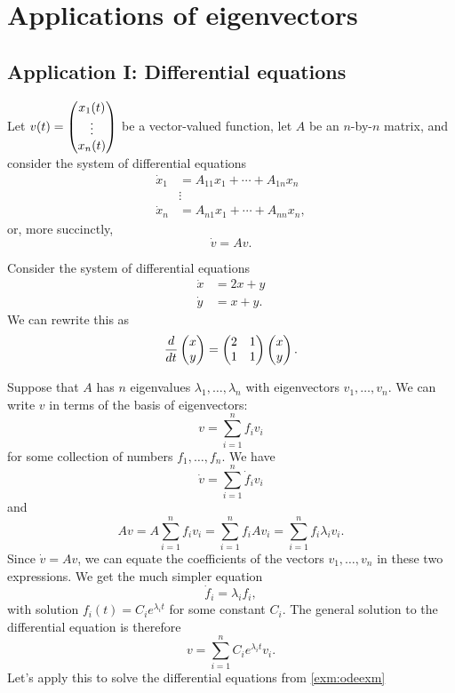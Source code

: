 \documentclass{article}
\begin{document}
\section{Applications of eigenvectors}
\subsection{Application I: Differential equations}


Let \(v(t)=\begin{pmatrix} x_1(t)\\ \vdots \\ x_n(t)\end{pmatrix}\) be a vector-valued
function, let \(A\) be an \(n\)-by-\(n\) matrix, and consider the
system of differential equations
\begin{align*}
\dot{x}_1&=A_{11}x_1+\cdots+A_{1n}x_n\\
&\vdots\\
\dot{x}_n&=A_{n1}x_1+\cdots+A_{nn}x_n,
\end{align*}
or, more succinctly,
\[\dot{v}=Av.\]


\begin{Example}\label{exm:odeexm}
Consider the system of differential equations
\begin{align*}
\dot{x}&=2x+y\\
\dot{y}&=x+y.
\end{align*}
We can rewrite this as \[\frac{d}{dt}\begin{pmatrix} x \\ y \end{pmatrix}=\begin{pmatrix} 2 & 1\\ 1 &
1\end{pmatrix}\begin{pmatrix} x \\ y \end{pmatrix}.\]


\end{Example}
Suppose that \(A\) has \(n\) eigenvalues
\(\lambda_1,\ldots,\lambda_n\) with eigenvectors
\(v_1,\ldots,v_n\). We can write \(v\) in terms of the basis of
eigenvectors: \[v=\sum_{i=1}^nf_iv_i\] for some collection of numbers
\(f_1,\ldots,f_n\). We have \[\dot{v}=\sum_{i=1}^n\dot{f}_iv_i\] and
\[Av=A\sum_{i=1}^nf_iv_i=\sum_{i=1}^nf_iAv_i=\sum_{i=1}^nf_i\lambda_iv_i.\]
Since \(\dot{v}=Av\), we can equate the coefficients of the vectors
\(v_1,\ldots,v_n\) in these two expressions. We get the much simpler
equation \[\dot{f}_i=\lambda_i f_i,\] with solution
\(f_i(t)=C_ie^{\lambda_i t}\) for some constant \(C_i\). The general
solution to the differential equation is therefore
\[v=\sum_{i=1}^nC_ie^{\lambda_it}v_i.\] Let's apply this to solve the
differential equations from \cref{exm:odeexm}
\end{document}
